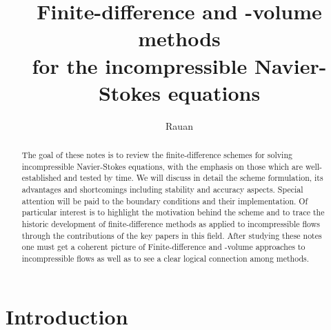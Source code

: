 \documentclass{article}
\title{Finite-difference and -volume methods \\ for the incompressible Navier-Stokes equations}
\author{Rauan}
\begin{document}
\maketitle

\begin{abstract}
The goal of these notes is to review the finite-difference schemes for solving incompressible Navier-Stokes equations, with the emphasis on those which are well-established and tested by time. We will discuss in detail the scheme formulation, its advantages and shortcomings including stability and accuracy aspects. Special attention will be paid to the boundary conditions and their implementation. Of particular interest is to highlight the motivation behind the scheme and to trace the historic development of finite-difference methods as applied to incompressible flows through the contributions of the key papers in this field. After studying these notes one must get a coherent picture of Finite-difference and -volume approaches to incompressible flows as well as to see a clear logical connection among methods.
\end{abstract}

\tableofcontents

\section{Introduction} \label{sec:introduction}
\end{document}
